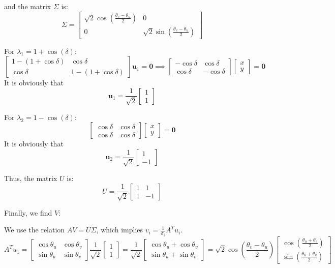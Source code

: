 \documentclass{article}
\newcommand{\0}{{\mathbf{0}}} %
\begin{document}
and the matrix $\Sigma$ is:
$$\Sigma =
\begin{bmatrix} \sqrt{2}\cos\left(\frac{\theta_v - \theta_u}{2}\right) & 0 \\ 0 & \sqrt{2}\sin\left(\frac{\theta_v - \theta_u}{2}\right)
\end{bmatrix}$$

For $\lambda_1 = 1 + \cos(\delta)$:
$$
\begin{bmatrix} 1 - (1+\cos\delta) & \cos\delta \\ \cos\delta & 1 - (1+\cos\delta)
\end{bmatrix} \mathbf{u}_1 = \mathbf{0} \implies
\begin{bmatrix} -\cos\delta & \cos\delta \\ \cos\delta & -\cos\delta
\end{bmatrix}
\begin{bmatrix} x \\ y
\end{bmatrix} = \mathbf{0}$$
It is obviously that
$$\mathbf{u}_1 = \frac{1}{\sqrt{2}}
\begin{bmatrix} 1 \\ 1
\end{bmatrix}$$

For $\lambda_2 = 1 - \cos(\delta)$:
$$
\begin{bmatrix} \cos\delta & \cos\delta \\ \cos\delta & \cos\delta
\end{bmatrix}
\begin{bmatrix} x \\ y
\end{bmatrix} = \mathbf{0}$$
It is obviously that
$$\mathbf{u}_2 = \frac{1}{\sqrt{2}}
\begin{bmatrix} 1 \\ -1
\end{bmatrix}$$

Thus, the matrix $U$ is:
$$U = \frac{1}{\sqrt{2}}
\begin{bmatrix} 1 & 1 \\ 1 & -1
\end{bmatrix}$$

Finally, we find $V$:

We use the relation $AV = U\Sigma$, which implies $v_i = \frac{1}{\sigma_i} A^T u_i$.
$$A^T u_1
=
\begin{bmatrix} \cos\theta_u & \cos\theta_v \\ \sin\theta_u & \sin\theta_v
\end{bmatrix} \frac{1}{\sqrt{2}}
\begin{bmatrix} 1 \\ 1
\end{bmatrix}
= \frac{1}{\sqrt{2}}
\begin{bmatrix} \cos\theta_u + \cos\theta_v \\ \sin\theta_u + \sin\theta_v
\end{bmatrix}
= \sqrt{2}\cos(\frac{\theta_v - \theta_u}{2})
\begin{bmatrix} \cos(\frac{\theta_u+\theta_v}{2}) \\ \sin(\frac{\theta_u+\theta_v}{2})
\end{bmatrix}$$
\end{document}

